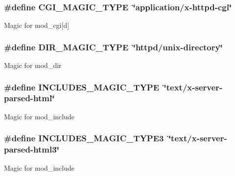 \subsubsection[{\texorpdfstring{C\+G\+I\+\_\+\+M\+A\+G\+I\+C\+\_\+\+T\+Y\+PE}{CGI_MAGIC_TYPE}}]{\setlength{\rightskip}{0pt plus 5cm}\#define C\+G\+I\+\_\+\+M\+A\+G\+I\+C\+\_\+\+T\+Y\+PE~\char`\"{}application/{\bf x}-\/httpd-\/cgi\char`\"{}}\hypertarget{group__module__magic_gad3207ba2e5e874a218a355eaf0877643}{}\label{group__module__magic_gad3207ba2e5e874a218a355eaf0877643}
Magic for mod\+\_\+cgi\mbox{[}d\mbox{]} 
\subsubsection[{\texorpdfstring{D\+I\+R\+\_\+\+M\+A\+G\+I\+C\+\_\+\+T\+Y\+PE}{DIR_MAGIC_TYPE}}]{\setlength{\rightskip}{0pt plus 5cm}\#define D\+I\+R\+\_\+\+M\+A\+G\+I\+C\+\_\+\+T\+Y\+PE~\char`\"{}httpd/unix-\/{\bf directory}\char`\"{}}\hypertarget{group__module__magic_ga4f329be3fb523b9e986cb13480ba9990}{}\label{group__module__magic_ga4f329be3fb523b9e986cb13480ba9990}
Magic for mod\+\_\+dir 
\subsubsection[{\texorpdfstring{I\+N\+C\+L\+U\+D\+E\+S\+\_\+\+M\+A\+G\+I\+C\+\_\+\+T\+Y\+PE}{INCLUDES_MAGIC_TYPE}}]{\setlength{\rightskip}{0pt plus 5cm}\#define I\+N\+C\+L\+U\+D\+E\+S\+\_\+\+M\+A\+G\+I\+C\+\_\+\+T\+Y\+PE~\char`\"{}text/{\bf x}-\/{\bf server}-\/parsed-\/html\char`\"{}}\hypertarget{group__module__magic_gac5a920125c7b78ceaaef16f37a8565c6}{}\label{group__module__magic_gac5a920125c7b78ceaaef16f37a8565c6}
Magic for mod\+\_\+include 
\subsubsection[{\texorpdfstring{I\+N\+C\+L\+U\+D\+E\+S\+\_\+\+M\+A\+G\+I\+C\+\_\+\+T\+Y\+P\+E3}{INCLUDES_MAGIC_TYPE3}}]{\setlength{\rightskip}{0pt plus 5cm}\#define I\+N\+C\+L\+U\+D\+E\+S\+\_\+\+M\+A\+G\+I\+C\+\_\+\+T\+Y\+P\+E3~\char`\"{}text/{\bf x}-\/{\bf server}-\/parsed-\/html3\char`\"{}}\hypertarget{group__module__magic_ga37aaf2dbe19ca4894dc31bf873b1861a}{}\label{group__module__magic_ga37aaf2dbe19ca4894dc31bf873b1861a}
Magic for mod\+\_\+include 